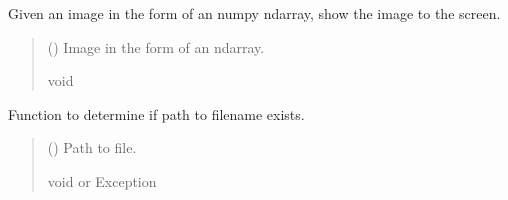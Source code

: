 \documentclass[letterpaper,10pt,english]{sphinxmanual}
\begin{document}
\begin{fulllineitems}
\begin{fulllineitems}
\end{fulllineitems}


\begin{fulllineitems}
\label{\detokenize{comp_viz.utils:comp_viz.utils.toolbox.Tools.show_image}}
\pysigstartsignatures
{}
\pysigstopsignatures
\sphinxAtStartPar
Given an image in the form of an numpy ndarray, show the image to the screen.
\begin{quote}\begin{description}
\sphinxAtStartPar
{} () \textendash{} Image in the form of an ndarray.

\sphinxAtStartPar
void

\end{description}\end{quote}

\end{fulllineitems}


\begin{fulllineitems}
\label{\detokenize{comp_viz.utils:comp_viz.utils.toolbox.Tools.verify_exists}}
\pysigstartsignatures
{}
\pysigstopsignatures
\sphinxAtStartPar
Function to determine if path to filename exists.
\begin{quote}\begin{description}
\sphinxAtStartPar
{} () \textendash{} Path to file.

\sphinxAtStartPar
void or Exception

\end{description}\end{quote}

\end{fulllineitems}


\end{fulllineitems}
\end{document}
